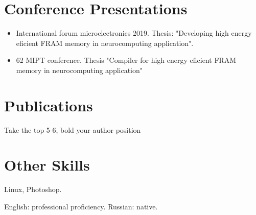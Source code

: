 \documentclass{article}
\begin{document}
\section{Conference Presentations }

\begin{itemize}
\item International forum microelectronics 2019. Thesis: "Developing high energy eficient FRAM memory in neurocomputing application".
\item 62 MIPT conference. Thesis "Compiler for high energy eficient FRAM memory in neurocomputing application"
\end{itemize}


\section{Publications}
Take the top 5-6, bold your author position


\section{Other Skills}
\begin{description}[widest=Langauges]
\item[Software]	Linux, Photoshop.
\item[Languages]	English: professional proficiency.  Russian: native.
\end{description}
\end{document}
